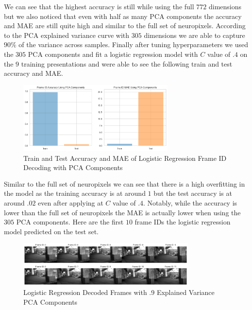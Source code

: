 \documentclass[12pt, letterpaper]{article}
\begin{document}
We can see that the highest accuracy is still while using the full $772$ dimensions but we also noticed that even with half as many PCA components the accuracy and MAE are still quite high and similar to the full set of neuropixels. According to the PCA explained variance curve with $305$ dimensions we are able to capture $90\%$ of the variance across samples. Finally after tuning hyperparameters we used the $305$ PCA components and fit a logistic regression model with $C$ value of $.4$ on the $9$ training presentations and were able to see the following train and test accuracy and MAE.

\begin{figure}[H]
    \centering
    \includegraphics[width=0.7\textwidth]{frame_id_metrics_logistic_C_.4_pca.png}
    \caption{Train and Test Accuracy and MAE of Logistic Regression Frame ID Decoding with PCA Components}
    \label{fig:logistic_pca_frame_id}
\end{figure}

Similar to the full set of neuropixels we can see that there is a high overfitting in the model as the training accuracy is at around $1$ but the test accuracy is at around $.02$ even after applying at $C$ value of $.4$. Notably, while the accuracy is lower than the full set of neuropixels the MAE is actually lower when using the $305$ PCA components. Here are the first $10$ frame IDs the logistic regression model predicted on the test set.

\begin{figure}[H]
    \centering
    \includegraphics[width=0.8\textwidth]{.9_pca_logistic_reg_video.png}
    \caption{Logistic Regression Decoded Frames with .9 Explained Variance PCA Components}
    \label{fig:pca_logistic_frame_id_decoded}
\end{figure}
\end{document}
